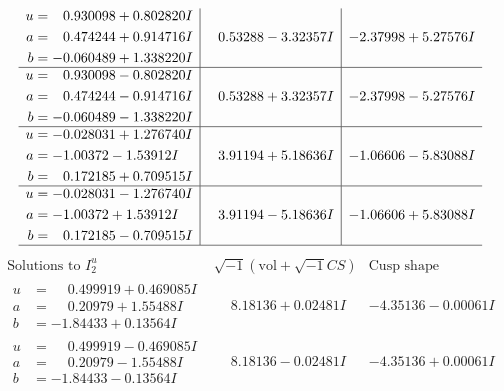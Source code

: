\documentclass[1p]{elsarticle_modified}
\theoremstyle{definition}
\newcommand{\I}{\sqrt{-1}}
\begin{document}
$$\begin{array}{c|c|c}
\begin{aligned}
u &= \phantom{-}0.930098 + 0.802820 I \\
a &= \phantom{-}0.474244 + 0.914716 I \\
b &= -0.060489 + 1.338220 I\end{aligned}
 & \phantom{-}0.53288 - 3.32357 I & -2.37998 + 5.27576 I \\ \hline\begin{aligned}
u &= \phantom{-}0.930098 - 0.802820 I \\
a &= \phantom{-}0.474244 - 0.914716 I \\
b &= -0.060489 - 1.338220 I\end{aligned}
 & \phantom{-}0.53288 + 3.32357 I & -2.37998 - 5.27576 I \\ \hline\begin{aligned}
u &= -0.028031 + 1.276740 I \\
a &= -1.00372 - 1.53912 I \\
b &= \phantom{-}0.172185 + 0.709515 I\end{aligned}
 & \phantom{-}3.91194 + 5.18636 I & -1.06606 - 5.83088 I \\ \hline\begin{aligned}
u &= -0.028031 - 1.276740 I \\
a &= -1.00372 + 1.53912 I \\
b &= \phantom{-}0.172185 - 0.709515 I\end{aligned}
 & \phantom{-}3.91194 - 5.18636 I & -1.06606 + 5.83088 I\\
 \hline 
 \end{array}$$\newpage$$\begin{array}{c|c|c}  
\text{Solutions to }I^u_{2}& \I (\text{vol} + \sqrt{-1}CS) & \text{Cusp shape}\\
 \hline 
\begin{aligned}
u &= \phantom{-}0.499919 + 0.469085 I \\
a &= \phantom{-}0.20979 + 1.55488 I \\
b &= -1.84433 + 0.13564 I\end{aligned}
 & \phantom{-}8.18136 + 0.02481 I & -4.35136 - 0.00061 I \\ \hline\begin{aligned}
u &= \phantom{-}0.499919 - 0.469085 I \\
a &= \phantom{-}0.20979 - 1.55488 I \\
b &= -1.84433 - 0.13564 I\end{aligned}
 & \phantom{-}8.18136 - 0.02481 I & -4.35136 + 0.00061 I \\ \hline\begin{aligned}

\end{aligned}
\end{array}$$
\end{document}
